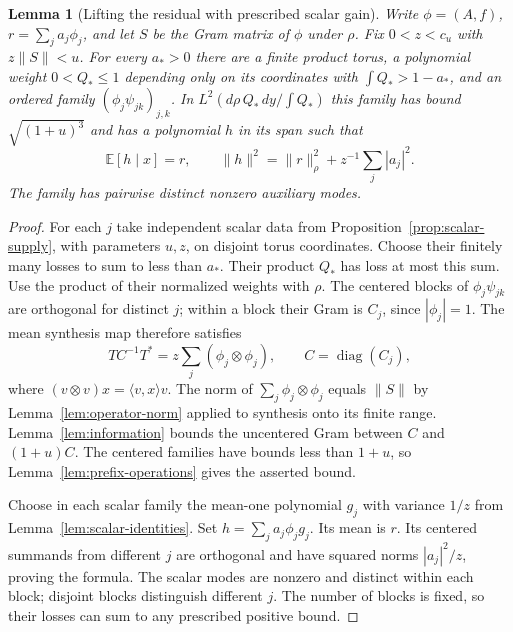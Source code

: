 \documentclass[reqno,a4paper,12pt]{amsart}
\newtheorem{lemma}[theorem]{Lemma}
\theoremstyle{definition}
\newcommand{\ip}[2]{\langle #1,#2\rangle}
\newcommand{\diag}{\operatorname{diag}}
\newcommand{\E}{\mathbb E}
\begin{document}
\begin{lemma}[Lifting the residual with prescribed scalar gain]
\label{lem:residual-lift}
Write $\phi=(A,f)$, $r=\sum_ja_j\phi_j$, and let $S$ be the Gram
matrix of $\phi$ under $\rho$. Fix $0<z<c_u$ with $z\|S\|<u$.
For every $a_*>0$ there are a finite product torus, a polynomial
weight $0<Q_*\le1$ depending only on its coordinates with
$\int Q_*>1-a_*$, and an ordered family
$(\phi_j\psi_{jk})_{j,k}$.
In $L^2(d\rho\,Q_*\,dy/\int Q_*)$ this family has bound
$\sqrt{(1+u)^3}$ and has a polynomial $h$ in its span such that
\[
 \E[h\mid x]=r,\qquad
 \|h\|^2=\|r\|_\rho^2+z^{-1}\sum_j|a_j|^2.
\]
The family has pairwise distinct nonzero auxiliary modes.
\end{lemma}
\begin{proof}
For each $j$ take independent scalar data from
Proposition~\ref{prop:scalar-supply}, with parameters $u,z$, on
disjoint torus coordinates. Choose their finitely many losses to
sum to less than $a_*$. Their product $Q_*$ has loss at most this sum.
Use the product of their normalized weights with $\rho$.
The centered blocks of $\phi_j\psi_{jk}$ are orthogonal for distinct
$j$; within a block their Gram is $C_j$, since $|\phi_j|=1$.
The mean synthesis map therefore satisfies
\[
 TC^{-1}T^*=z\sum_j(\phi_j\otimes\phi_j),\qquad
 C=\diag(C_j),
\]
where $(v\otimes v)x=\ip{v}{x}v$.
The norm of $\sum_j\phi_j\otimes\phi_j$ equals $\|S\|$ by
Lemma~\ref{lem:operator-norm} applied to synthesis onto its finite
range. Lemma~\ref{lem:information} bounds the uncentered Gram between
$C$ and $(1+u)C$. The centered families have bounds less than
$1+u$, so Lemma~\ref{lem:prefix-operations} gives the asserted bound.

Choose in each scalar family the mean-one polynomial $g_j$ with
variance $1/z$ from Lemma~\ref{lem:scalar-identities}.
Set $h=\sum_j a_j\phi_jg_j$.
Its mean is $r$. Its centered summands from different $j$ are
orthogonal and have squared norms $|a_j|^2/z$, proving the formula.
The scalar modes are nonzero and distinct within each block; disjoint
blocks distinguish different $j$. The number of blocks is fixed,
so their losses can sum to any prescribed positive bound.
\end{proof}
\end{document}

